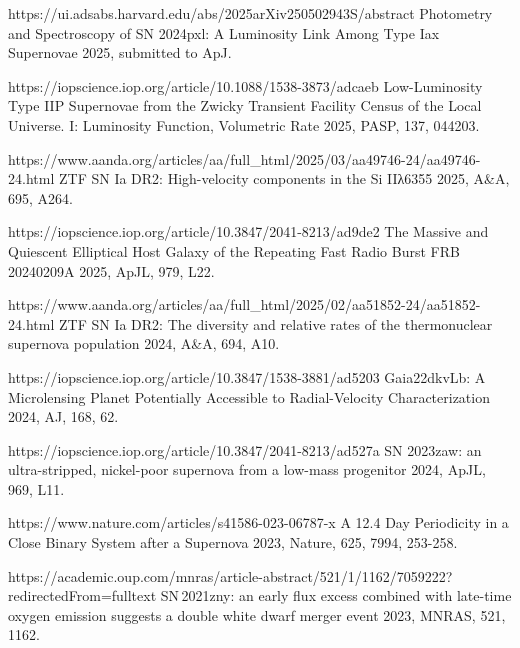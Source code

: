 \begin{cvpubs}
\begin{cvpubitems}
{\Cliu}
{https://ui.adsabs.harvard.edu/abs/2025arXiv250502943S/abstract}
{Photometry and Spectroscopy of SN 2024pxl: A Luminosity Link Among Type Iax Supernovae}
{2025, submitted to ApJ.}

{\Cliu}
{https://iopscience.iop.org/article/10.1088/1538-3873/adcaeb}
{Low-Luminosity Type IIP Supernovae from the Zwicky Transient Facility Census of the Local Universe. I: Luminosity Function, Volumetric Rate}
{2025, PASP, 137, 044203.}

{\Cliu}
{https://www.aanda.org/articles/aa/full_html/2025/03/aa49746-24/aa49746-24.html}
{ZTF SN Ia DR2: High-velocity components in the Si IIλ6355}
{2025, A\&A, 695, A264.}

{\Cliu}
{https://iopscience.iop.org/article/10.3847/2041-8213/ad9de2}
{The Massive and Quiescent Elliptical Host Galaxy of the Repeating Fast Radio Burst FRB 20240209A}
{2025, ApJL, 979, L22.}

{\Cliu}
{https://www.aanda.org/articles/aa/full_html/2025/02/aa51852-24/aa51852-24.html}
{ZTF SN Ia DR2: The diversity and relative rates of the thermonuclear supernova population}
{2024, A\&A, 694, A10.}

{\Cliu}
{https://iopscience.iop.org/article/10.3847/1538-3881/ad5203}
{Gaia22dkvLb: A Microlensing Planet Potentially Accessible to Radial-Velocity Characterization}
{2024, AJ, 168, 62.}

{\Cliu}
{https://iopscience.iop.org/article/10.3847/2041-8213/ad527a}
{SN 2023zaw: an ultra-stripped, nickel-poor supernova from a low-mass progenitor}
{2024, ApJL, 969, L11.}

{\Cliu}
{https://www.nature.com/articles/s41586-023-06787-x}
{A 12.4 Day Periodicity in a Close Binary System after a Supernova}
{2023, Nature, 625, 7994, 253-258.}

{\Cliu}
{https://academic.oup.com/mnras/article-abstract/521/1/1162/7059222?redirectedFrom=fulltext}
{SN\,2021zny: an early flux excess combined with late-time oxygen emission suggests a double white dwarf merger event}
{2023, MNRAS, 521, 1162.}

\end{cvpubitems}


\end{cvpubs}


